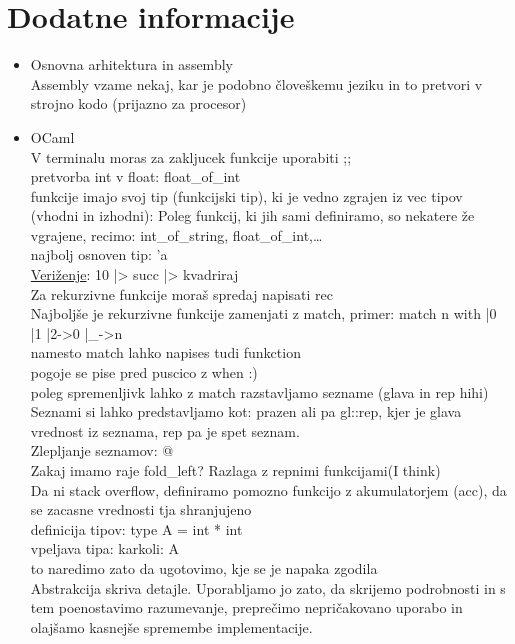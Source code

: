 \documentclass[a4paper]{article}
\begin{document}
\section*{Dodatne informacije}
    \begin{itemize}
        \item Osnovna arhitektura in assembly\\
        Assembly vzame nekaj, kar je podobno človeškemu jeziku in to pretvori v strojno kodo (prijazno za procesor)

        \item OCaml\\
        V terminalu moras za zakljucek funkcije uporabiti ;;\\
        pretvorba int v float: float\_of\_int\\
        funkcije imajo svoj tip (funkcijski tip), ki je vedno zgrajen iz vec tipov (vhodni in izhodni):  Poleg funkcij, ki jih sami definiramo, so nekatere že vgrajene, recimo: int\_of\_string, float\_of\_int,\ldots\\
        najbolj osnoven tip: 'a\\
        \underline{Veriženje}: 10 |> succ |> kvadriraj\\
        Za rekurzivne funkcije moraš spredaj napisati rec\\
        Najboljše je rekurzivne funkcije zamenjati z match, primer: match n with |0 |1 |2->0 |\_->n\\
        namesto match lahko napises tudi funkction\\
        pogoje se pise pred puscico z when :)\\
        poleg spremenljivk lahko z match razstavljamo sezname (glava in rep hihi)\\
        Seznami si lahko predstavljamo kot: prazen ali pa gl::rep, kjer je glava vrednost iz seznama, rep pa je spet seznam.\\
        Zlepljanje seznamov: @\\
        Zakaj imamo raje fold\_left? Razlaga z repnimi funkcijami(I think)\\
        Da ni stack overflow, definiramo pomozno funkcijo z akumulatorjem (acc), da se zacasne vrednosti tja shranjujeno\\
        definicija tipov: type A = int * int\\
        vpeljava tipa: karkoli: A\\
        to naredimo zato da ugotovimo, kje se je napaka zgodila\\
        Abstrakcija skriva detajle. Uporabljamo jo zato, da skrijemo podrobnosti in s tem poenostavimo razumevanje, preprečimo nepričakovano uporabo in olajšamo kasnejše spremembe implementacije.\\

\end{itemize}
\end{document}
